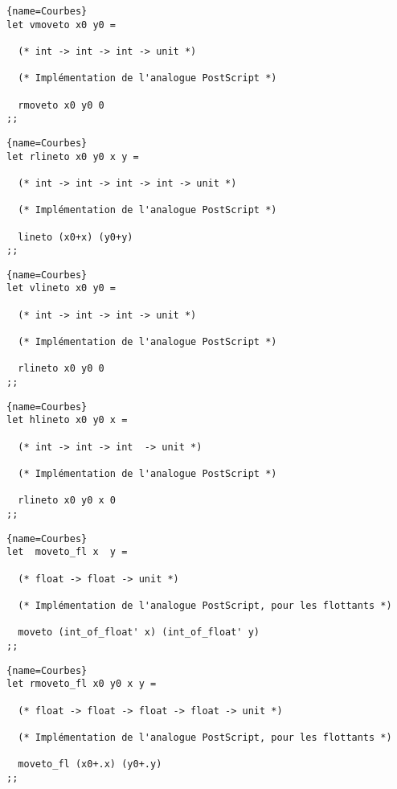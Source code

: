 \documentclass[10pt,twoside,a4paper]{article}
\begin{document}
\begin{lstlisting}{name=Courbes}
let vmoveto x0 y0 =

  (* int -> int -> int -> unit *)

  (* Implémentation de l'analogue PostScript *)
  
  rmoveto x0 y0 0
;;
\end{lstlisting}

\begin{lstlisting}{name=Courbes}
let rlineto x0 y0 x y =

  (* int -> int -> int -> int -> unit *)

  (* Implémentation de l'analogue PostScript *)
  
  lineto (x0+x) (y0+y)
;;
\end{lstlisting}

\begin{lstlisting}{name=Courbes}
let vlineto x0 y0 =

  (* int -> int -> int -> unit *)

  (* Implémentation de l'analogue PostScript *)
  
  rlineto x0 y0 0
;;
\end{lstlisting}

\begin{lstlisting}{name=Courbes}
let hlineto x0 y0 x =

  (* int -> int -> int  -> unit *)

  (* Implémentation de l'analogue PostScript *)
  
  rlineto x0 y0 x 0
;;
\end{lstlisting}

\begin{lstlisting}{name=Courbes}
let  moveto_fl x  y =

  (* float -> float -> unit *)

  (* Implémentation de l'analogue PostScript, pour les flottants *)
  
  moveto (int_of_float' x) (int_of_float' y)
;;
\end{lstlisting}

\begin{lstlisting}{name=Courbes}
let rmoveto_fl x0 y0 x y =
  
  (* float -> float -> float -> float -> unit *)

  (* Implémentation de l'analogue PostScript, pour les flottants *)
  
  moveto_fl (x0+.x) (y0+.y)
;;
\end{lstlisting}
\end{document}
